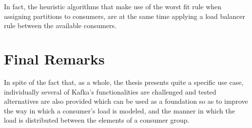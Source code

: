 In fact, the heuristic algorithms that make use of the worst fit rule when assigning partitions to consumers, are at the same time applying a load balancer rule between the available consumers.

\section{Final Remarks}

In spite of the fact that, as a whole, the thesis presents quite a specific use case, individually several of Kafka's functionalities are challenged and tested alternatives are also provided which can be used as a foundation so as to improve the way in which a consumer's load is modeled, and the manner in which the load is distributed between the elements of a consumer group.
